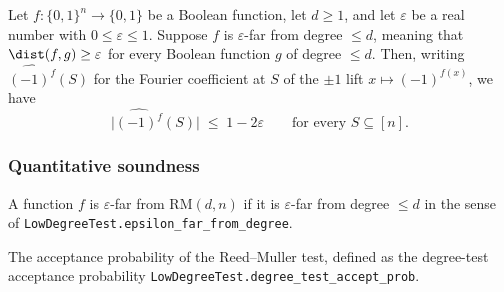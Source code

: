 \begin{lemma}
\label{LowDegreeTest.abs_fourier_coeff_le_of_far_from_degree}
\leanok
{}
Let $f : \{0,1\}^n \to \{0,1\}$ be a Boolean function, let $d \ge 1$, and let
$\varepsilon$ be a real number with $0 \le \varepsilon \le 1$. Suppose $f$ is
$\varepsilon$-far from degree $\le d$, meaning that $\dist(f,g) \ge \varepsilon$ for
every Boolean function $g$ of degree $\le d$. Then, writing $\widehat{(-1)^f}(S)$ for
the Fourier coefficient at $S$ of the $\pm 1$ lift $x \mapsto (-1)^{f(x)}$, we have
\[
  \bigl|\widehat{(-1)^f}(S)\bigr| \;\le\; 1 - 2\varepsilon
  \qquad\text{for every } S \subseteq [n].
\]
\end{lemma}

\subsubsection{Quantitative soundness}

\begin{definition}
\label{LowDegreeTest.epsilon_far_from_RM}
\leanok
{}
A function $f$ is $\varepsilon$-far from $\mathrm{RM}(d, n)$ if it is $\varepsilon$-far
from degree $\le d$ in the sense of
\texttt{LowDegreeTest.epsilon\_far\_from\_degree}.
\end{definition}

\begin{definition}
\label{LowDegreeTest.RM_test_accept_prob}
\leanok
{}
The acceptance probability of the Reed--Muller test, defined as the degree-test
acceptance probability \texttt{LowDegreeTest.degree\_test\_accept\_prob}.
\end{definition}

